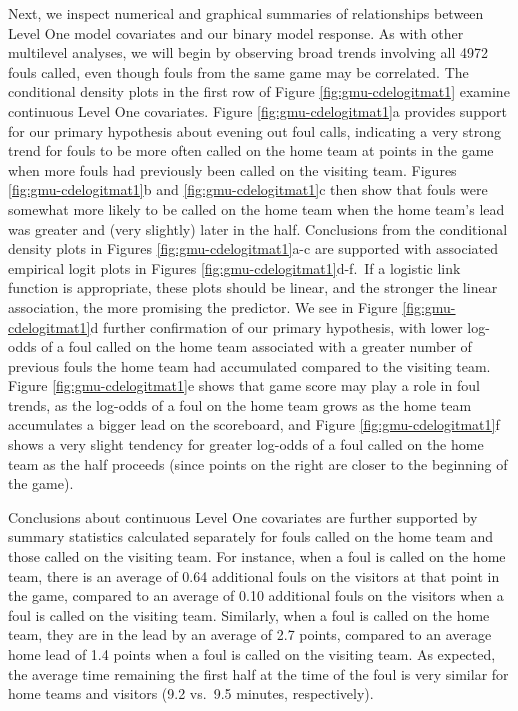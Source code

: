 \documentclass[
]{krantz}
\begin{document}
Next, we inspect numerical and graphical summaries of relationships between Level One model covariates and our binary model response. As with other multilevel analyses, we will begin by observing broad trends involving all 4972 fouls called, even though fouls from the same game may be correlated. The conditional density plots in the first row of Figure \ref{fig:gmu-cdelogitmat1} examine continuous Level One covariates. Figure \ref{fig:gmu-cdelogitmat1}a provides support for our primary hypothesis about evening out foul calls, indicating a very strong trend for fouls to be more often called on the home team at points in the game when more fouls had previously been called on the visiting team. Figures \ref{fig:gmu-cdelogitmat1}b and \ref{fig:gmu-cdelogitmat1}c then show that fouls were somewhat more likely to be called on the home team when the home team's lead was greater and (very slightly) later in the half. Conclusions from the conditional density plots in Figures \ref{fig:gmu-cdelogitmat1}a-c are supported with associated empirical logit plots in Figures \ref{fig:gmu-cdelogitmat1}d-f.~If a logistic link function is appropriate, these plots should be linear, and the stronger the linear association, the more promising the predictor. We see in Figure \ref{fig:gmu-cdelogitmat1}d further confirmation of our primary hypothesis, with lower log-odds of a foul called on the home team associated with a greater number of previous fouls the home team had accumulated compared to the visiting team. Figure \ref{fig:gmu-cdelogitmat1}e shows that game score may play a role in foul trends, as the log-odds of a foul on the home team grows as the home team accumulates a bigger lead on the scoreboard, and Figure \ref{fig:gmu-cdelogitmat1}f shows a very slight tendency for greater log-odds of a foul called on the home team as the half proceeds (since points on the right are closer to the beginning of the game).

Conclusions about continuous Level One covariates are further supported by summary statistics calculated separately for fouls called on the home team and those called on the visiting team. For instance, when a foul is called on the home team, there is an average of 0.64 additional fouls on the visitors at that point in the game, compared to an average of 0.10 additional fouls on the visitors when a foul is called on the visiting team. Similarly, when a foul is called on the home team, they are in the lead by an average of 2.7 points, compared to an average home lead of 1.4 points when a foul is called on the visiting team. As expected, the average time remaining the first half at the time of the foul is very similar for home teams and visitors (9.2 vs.~9.5 minutes, respectively).
\end{document}
